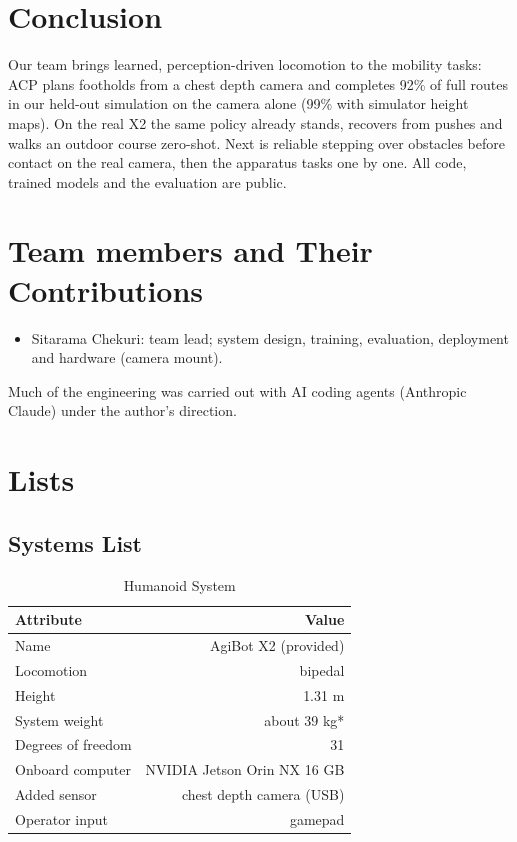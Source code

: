 \documentclass[journal]{IEEEtran}
\begin{document}
\section{Conclusion}
Our team brings learned, perception-driven locomotion to the mobility tasks: ACP plans footholds from a chest depth camera
and completes 92\% of full routes in our held-out simulation on the camera alone (99\% with simulator height maps). On the
real X2 the same policy already stands, recovers from pushes and walks an outdoor course zero-shot. Next is reliable stepping
over obstacles before contact on the real camera, then the apparatus tasks one by one. All code, trained models and the
evaluation are public.

\appendices

\section{Team members and Their Contributions}
\begin{itemize}
\item Sitarama Chekuri: team lead; system design, training, evaluation, deployment and hardware (camera mount).
\end{itemize}
Much of the engineering was carried out with AI coding agents (Anthropic Claude) under the author's direction.

\section{Lists}
\subsection{Systems List}
\begin{table}[!h]
\renewcommand{\arraystretch}{1}
 \tabcolsep=0.1cm
\caption{Humanoid System}
\label{tab:SystemRobot1}
\centering
\begin{tabular}{|l|r|}
\hline
Attribute & Value \\ \hline
Name & AgiBot X2 (provided) \\
Locomotion & bipedal \\
Height & 1.31 m \\
System weight & about 39 kg* \\
Degrees of freedom & 31 \\
Onboard computer & NVIDIA Jetson Orin NX 16 GB \\
Added sensor & chest depth camera (USB) \\
Operator input & gamepad \\
\hline
\end{tabular}
\end{table}
\end{document}
